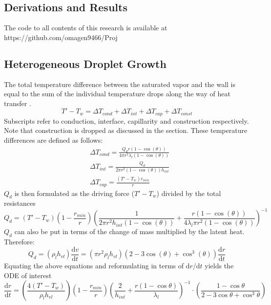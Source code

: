 \documentclass[12pt]{article}
\numberwithin{equation}{section}
\begin{document}
\begin{appendices}
\section{Derivations and Results}\label{s:appendix A}
The code to all contents of this research is available at https://github.com/omagen9466/Proj
\subsection{Heterogeneous Droplet Growth}
The total temperature difference between the saturated vapor and the wall is equal to the sum of the individual temperature drops along the way of heat transfer \cite{khandekar2020drop}.
\begin{equation}
    T'-T_{w}=\Delta T_{cond}+\Delta T_{int}+\Delta T_{cap}+\Delta T_{const}
\end{equation}
Subscripts refer to conduction, interface, capillarity and construction respectively. Note that construction is dropped as discussed in the section.
These temperature differences are defined as follows:
\begin{equation}
    \begin{aligned}
        &\Delta T_{cond}=\frac{Q_{d}r(1-\cos (\theta))}{4\pi r^{2}\lambda_{l}(1-\cos (\theta))}\\
        &\Delta T_{int}=\frac{Q_{d}}{2\pi r^{2}(1-\cos (\theta))h_{int}}\\
        &\Delta T_{cap}=\frac{(T'-T_{w})r_{min}}{r}
    \end{aligned}
\end{equation}
$Q_{d}$ is then formulated as the driving force ($T'-T_{w}$) divided by the total resistances
\begin{equation}
    Q_{d}=(T'-T_{w})\left(1-\frac{r_{min}}{r}\right)\left(\frac{1}{2\pi r^{2}h_{int}(1-\cos (\theta))}+\frac{r(1-\cos (\theta))}{4\lambda_{l}\pi r^{2}(1-\cos (\theta))}\right)^{-1}
\end{equation} 
$Q_{d}$ can also be put in terms of the change of mass multiplied by the latent heat. Therefore:
\begin{equation}
    Q_{d}=(\rho_{l}h_{vl})\frac{\mathrm{d}v}{\mathrm{d}t}=(\pi r^{2}\rho_{l}h_{vl})(2-3\cos (\theta)+\cos^{3}(\theta) )\frac{\mathrm{d}r}{\mathrm{d}t}
\end{equation}
Equating the above equations and reformulating in terms of $\mathrm{d}r/\mathrm{d}t$ yields the ODE of interest
\begin{equation}
    \frac{\mathrm{d}r}{\mathrm{d}t}= \left(\frac{4(T'-T_{w})}{\rho_{l}h_{vl}}\right)(1-\frac{r_{min}}{r})\left(\frac{2}{h_{int}}+\frac{r(1-\cos\theta)}{\lambda_{l}}\right)^{-1}  \cdot\left(\frac{1-\cos\theta}{2-3\cos\theta+\cos^{3}\theta}\right)
\end{equation}


\end{appendices}
\end{document}
